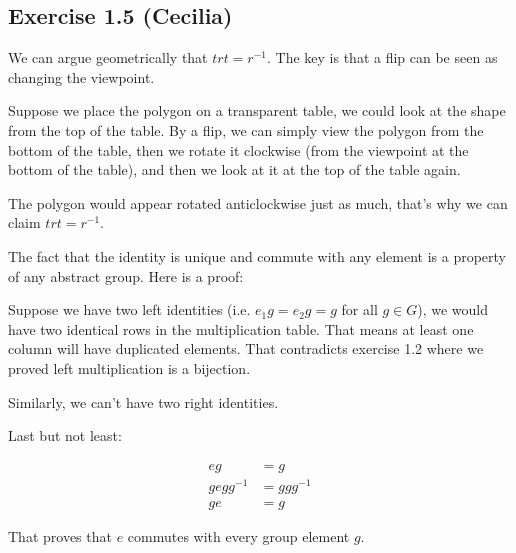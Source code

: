 \subsection*{Exercise 1.5 (Cecilia)}

We can argue geometrically that $trt=r^{-1}$. The key is that a flip can be seen as changing the viewpoint.

Suppose we place the polygon on a transparent table, we could look at the shape from the top of the table. By a flip, we can simply view the polygon from the bottom of the table, then we rotate it clockwise (from the viewpoint at the bottom of the table), and then we look at it at the top of the table again.

The polygon would appear rotated anticlockwise just as much, that's why we can claim $trt=r^{-1}$.

The fact that the identity is unique and commute with any element is a property of any abstract group. Here is a proof:

Suppose we have two left identities (i.e. $e_1 g = e_2 g = g$ for all $ g \in G$), we would have two identical rows in the multiplication table. That means at least one column will have duplicated elements. That contradicts exercise 1.2 where we proved left multiplication is a bijection.

Similarly, we can't have two right identities.

Last but not least:

\begin{align*}
    eg &= g \\
    gegg^{-1} &= ggg^{-1} \\
    ge &= g 
\end{align*}

That proves that $e$ commutes with every group element $g$.